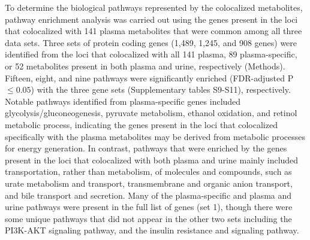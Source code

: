 \documentclass[a4paper,10pt]{article}
\begin{document}
To determine the biological pathways represented by the colocalized metabolites, pathway enrichment analysis was carried out using the genes present in the loci that colocalized with 141 plasma metabolites that were common among all three data sets.
Three sets of protein coding genes (1,489, 1,245, and 908 genes) were identified from the loci that colocalized with all 141 plasma, 89 plasma-specific, or 52 metabolites present in both plasma and urine, respectively (Methods).
Fifteen, eight, and nine pathways were significantly enriched (FDR-adjusted P $\le 0.05$) with the three gene sets (Supplementary tables S9-S11), respectively.
Notable pathways identified from plasma-specific genes included glycolysis/gluconeogenesis, pyruvate metabolism, ethanol oxidation, and retinol metabolic process, indicating the genes present in the loci that colocalized specifically with the plasma metabolites may be derived from metabolic processes for energy generation.
In contrast, pathways that were enriched by the genes present in the loci that colocalized with both plasma and urine mainly included transportation, rather than metabolism, of molecules and compounds, such as urate metabolism and transport, transmembrane and organic anion transport, and bile transport and secretion.
Many of the plasma-specific and plasma and urine pathways were present in the full list of genes (set 1), though there were some unique pathways that did not appear in the other two sets including the PI3K-AKT signaling pathway, and the insulin resistance and signaling pathway.
\\
\end{document}
